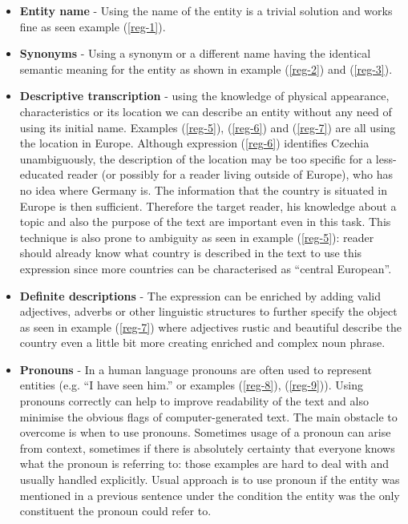 \begin{itemize}
	\item \textbf{Entity name} - Using the name of the entity is a trivial solution and works fine as seen example (\ref{reg-1}).
	\item \textbf{Synonyms} - Using a synonym or a different name having the identical semantic meaning for the entity as shown in example (\ref{reg-2}) and (\ref{reg-3}). 
	\item \textbf{Descriptive transcription}  - using the knowledge of physical appearance, characteristics or its location we can describe an entity without any need of using its initial name. Examples (\ref{reg-5}), (\ref{reg-6}) and (\ref{reg-7}) are all using the location in Europe. Although expression (\ref{reg-6}) identifies Czechia unambiguously, the description of the location may be too specific for a less-educated reader (or possibly for a reader living outside of Europe), who has no idea where Germany is. The information that the country is situated in Europe is then sufficient. Therefore the target reader, his knowledge about a topic and also the purpose of the text are important even in this task. This technique is also prone to ambiguity as seen in example (\ref{reg-5}): reader should already know what country is described in the text to use this expression since more countries can be characterised as “central European”.
	\item \textbf{Definite descriptions} - The expression can be enriched by adding valid adjectives, adverbs or other linguistic structures to further specify the object as seen in example (\ref{reg-7}) where adjectives rustic and beautiful describe the country even a little bit more creating enriched and complex noun phrase.
	\item \textbf{Pronouns} - In a human language pronouns are often used to represent entities (e.g. “I have seen him.” or examples (\ref{reg-8}), (\ref{reg-9})). Using pronouns correctly can help to improve readability of the text and also minimise the obvious flags of computer-generated text. The main obstacle to overcome is when to use pronouns. Sometimes usage of a pronoun can arise from context, sometimes if there is absolutely certainty that everyone knows what the pronoun is referring to: those examples are hard to deal with and usually handled explicitly. Usual approach is to use pronoun if the entity was mentioned in a previous sentence under the condition the entity was the only constituent the pronoun could refer to.
\end{itemize}

